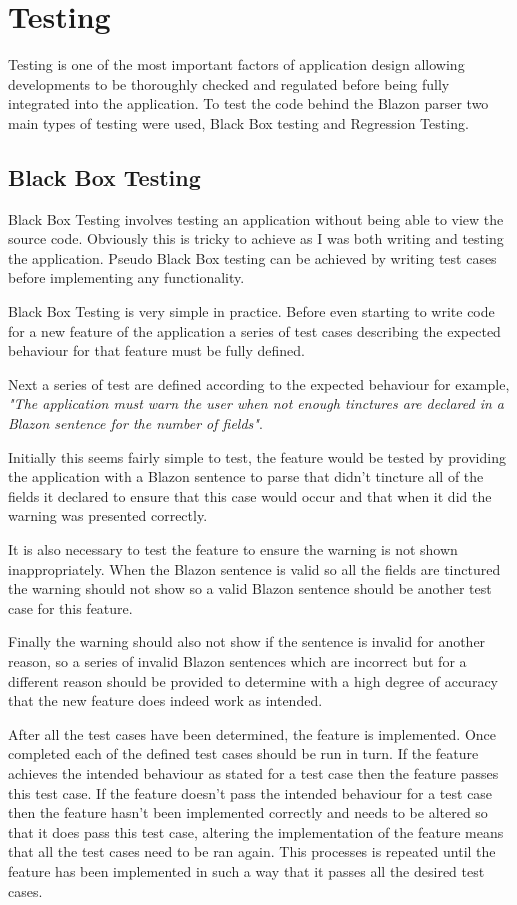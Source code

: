 \chapter{Testing}

Testing is one of the most important factors of application design allowing developments to be thoroughly checked and regulated before being fully integrated into the application.  To test the code behind the Blazon parser two main types of testing were used, Black Box testing and Regression Testing.  
\section{Black Box Testing}

Black Box Testing involves testing an application without being able to view the source code.  Obviously this is tricky to achieve as I was both writing and testing the application.  Pseudo Black Box testing can be achieved by writing test cases before implementing any functionality. 

Black Box Testing is very simple in practice.  Before even starting to write code for a new feature of the application a series of test cases describing the expected behaviour for that feature must be fully defined. 

Next a series of test are defined according to the expected behaviour for example, \emph{"The application must warn the user when not enough tinctures are declared in a Blazon sentence for the number of fields"}.  

Initially this seems fairly simple to test, the feature would be tested by providing the application with a Blazon sentence to parse that didn't tincture all of the fields it declared to ensure that this case would occur and that when it did the warning was presented correctly.

It is also necessary to test the feature to ensure the warning is not shown inappropriately.  When the Blazon sentence is valid so all the fields are tinctured the warning should not show so a valid Blazon sentence should be another test case for this feature.

Finally the warning should also not show if the sentence is invalid for another reason, so a series of invalid Blazon sentences which are incorrect but for a different reason should be provided to determine with a high degree of accuracy that the new feature does indeed work as intended. 

After all the test cases have been determined, the feature is implemented.  Once completed each of the defined test cases should be run in turn.  If the feature achieves the intended behaviour as stated for a test case then the feature passes this test case.  If the feature doesn't pass the intended behaviour for a test case then the feature hasn't been implemented correctly and needs to be altered so that it does pass this test case, altering the implementation of the feature means that all the test cases need to be ran again.  This processes is repeated until the feature has been implemented in such a way that it passes all the desired test cases.


